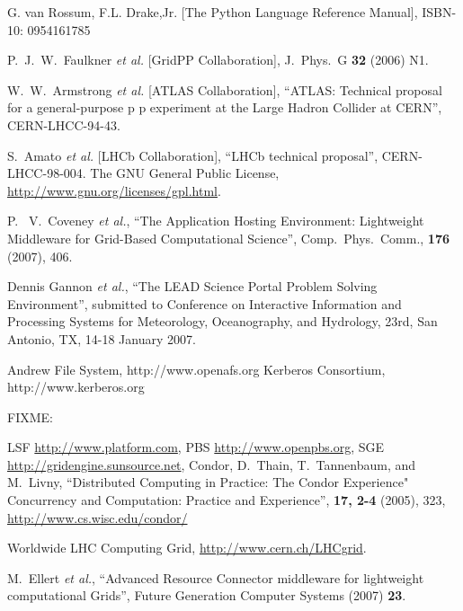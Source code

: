 \documentclass{elsart}
\begin{document}
\begin{thebibliography}{00}

 G. van Rossum, F.L. Drake,Jr. [The Python Language Reference Manual], ISBN-10: 0954161785

  P.~J.~W.~Faulkner {\it et al.}  [GridPP Collaboration],
  J.\ Phys.\ G {\bf 32} (2006) N1.

  W.~W.~Armstrong {\it et al.}  [ATLAS Collaboration],
  ``ATLAS: Technical proposal for a general-purpose p p experiment at the
  Large Hadron Collider at CERN'', CERN-LHCC-94-43.

  S.~Amato {\it et al.}  [LHCb Collaboration],
  ``LHCb technical proposal'', CERN-LHCC-98-004.
  The GNU General Public License,
  \url{http://www.gnu.org/licenses/gpl.html}.

  P.~ V.~Coveney {\it et al.}, ``The Application Hosting Environment:
  Lightweight Middleware for Grid-Based Computational Science'',
  Comp.~Phys.~Comm., {\bf 176} (2007), 406.

  Dennis Gannon {\it et al.}, ``The LEAD Science Portal Problem Solving
  Environment'', submitted to Conference on Interactive Information and
  Processing Systems for Meteorology, Oceanography, and Hydrology, 23rd, San
  Antonio, TX, 14-18 January 2007.

 Andrew File System, http://www.openafs.org
 Kerberos Consortium, http://www.kerberos.org

 FIXME:


  LSF \url{http://www.platform.com}, PBS \url{http://www.openpbs.org}, SGE
  \url{http://gridengine.sunsource.net}, Condor, D.~Thain, T.~Tannenbaum, and
  M.~Livny, ``Distributed Computing in Practice: The Condor Experience"
  Concurrency and Computation: Practice and Experience'', {\bf 17, 2-4}
  (2005), 323, \url{http://www.cs.wisc.edu/condor/}

Worldwide LHC Computing Grid, \url{http://www.cern.ch/LHCgrid}.

  M.~Ellert {\it et al.}, ``Advanced Resource Connector middleware for
  lightweight computational Grids'', Future Generation Computer Systems
  (2007) {\bf23}.
  

\end{thebibliography}
\end{document}
